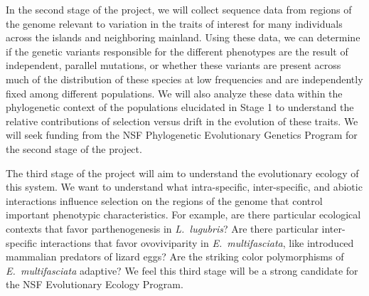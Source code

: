 In the second stage of the project, we will collect sequence data from regions
of the genome relevant to variation in the traits of interest for many
individuals across the islands and neighboring mainland.
Using these data, we can determine if the genetic variants responsible for the
different phenotypes are the result of independent, parallel mutations, or
whether these variants are present across much of the distribution of these
species at low frequencies and are independently fixed among different
populations.
We will also analyze these data within the phylogenetic context of the
populations elucidated in Stage 1 to understand the relative contributions of
selection versus drift in the evolution of these traits.
We will seek funding from the NSF Phylogenetic Evolutionary Genetics Program
for the second stage of the project.

The third stage of the project will aim to understand the evolutionary ecology
of this system.
We want to understand what intra-specific, inter-specific, and abiotic
interactions influence selection on the regions of the genome that control
important phenotypic characteristics.
For example, are there particular ecological contexts that favor
parthenogenesis in \emph{L.\ lugubris}?
Are there particular inter-specific interactions that favor ovoviviparity in
\emph{E.\ multifasciata}, like introduced mammalian predators of lizard eggs?
Are the striking color polymorphisms of \emph{E.\ multifasciata} adaptive?
We feel this third stage will be a strong candidate for the NSF Evolutionary
Ecology Program.

